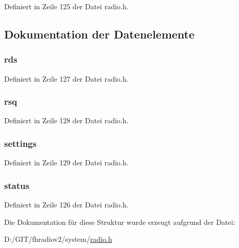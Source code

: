 Definiert in Zeile 125 der Datei radio.\+h.



\subsection{Dokumentation der Datenelemente}
\hypertarget{structradio_a44efb20f93a5de661983c36b4a870f4e}{}
\subsubsection[{rds}]{ {\bf rds}}\label{structradio_a44efb20f93a5de661983c36b4a870f4e}


Definiert in Zeile 127 der Datei radio.\+h.

\hypertarget{structradio_aba45ded08c975dcc6ee7d58687e8534e}{}
\subsubsection[{rsq}]{ rsq}\label{structradio_aba45ded08c975dcc6ee7d58687e8534e}


Definiert in Zeile 128 der Datei radio.\+h.

\hypertarget{structradio_a458724faf4e8216b3d6b8beb9b2894c2}{}
\subsubsection[{settings}]{ settings}\label{structradio_a458724faf4e8216b3d6b8beb9b2894c2}


Definiert in Zeile 129 der Datei radio.\+h.

\hypertarget{structradio_ac40df2ac7cfc276418e34335098903fb}{}
\subsubsection[{status}]{ {\bf status}}\label{structradio_ac40df2ac7cfc276418e34335098903fb}


Definiert in Zeile 126 der Datei radio.\+h.



Die Dokumentation für diese Struktur wurde erzeugt aufgrund der Datei\+:\begin{DoxyCompactItemize}
\item 
D\+:/\+G\+I\+T/fhradiov2/system/\hyperlink{radio_8h}{radio.\+h}\end{DoxyCompactItemize}
